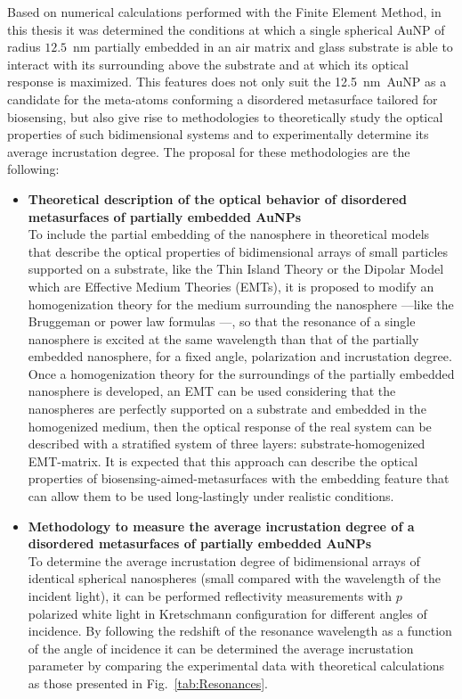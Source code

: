 
Based on numerical calculations performed with the Finite Element Method, in this thesis it was determined the conditions at which a single spherical AuNP of radius $12.5$~nm partially embedded in an air matrix and glass substrate is able to interact with its surrounding above the substrate and  at which its optical response is maximized. This features does not only suit the 12.5~nm~AuNP as a candidate for the meta-atoms conforming a disordered metasurface tailored for biosensing, but also give rise to  methodologies to theoretically study the optical properties of such bidimensional systems and to  experimentally determine its average incrustation degree. The proposal for these methodologies are the following:

    \begin{itemize}
    \item \textbf{Theoretical description of the optical behavior of disordered metasurfaces of partially embedded AuNPs}\\
    To include the partial embedding of the nanosphere in theoretical models that describe the optical properties of bidimensional arrays of small particles supported on a substrate, like the Thin Island Theory \cite{bedeaux_optical_2004} or the Dipolar Model \cite{barrera1991optical} which are Effective Medium Theories (EMTs), it is proposed to modify an homogenization theory for the medium surrounding the nanosphere ---like the Bruggeman or power law formulas \cite{sihvola_electromagnetic_2008}---, so that the resonance of a single nanosphere is excited at the same wavelength than that of the partially embedded nanosphere, for a fixed angle, polarization and incrustation degree.  Once a homogenization theory for the surroundings of the partially embedded nanosphere is developed, an EMT can be used considering that the nanospheres are perfectly supported on a substrate and embedded in the homogenized medium, then the optical response of the real system can be described with a stratified system of three layers: substrate-homogenized EMT-matrix. It is expected that this approach can describe the optical properties of biosensing-aimed-metasurfaces with the embedding feature that can allow them to be used long-lastingly under realistic conditions.
    \item \textbf{Methodology to measure the average incrustation degree of a disordered metasurfaces of partially embedded AuNPs}\\
    To determine the average incrustation degree of bidimensional arrays of identical spherical nanospheres (small compared with the wavelength of the incident light), it can be performed reflectivity measurements with $p$ polarized white light in Kretschmann configuration for different angles of incidence. By following the redshift of the resonance wavelength as a function of the angle of incidence it can be determined the average incrustation parameter by comparing the experimental data with theoretical calculations as those presented in Fig.~\ref{tab:Resonances}.
    \end{itemize}
